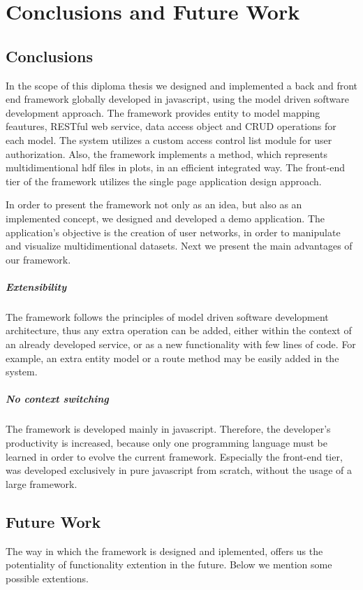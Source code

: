 \chapter{Conclusions and Future Work}

\section{Conclusions}
In the scope of this diploma thesis we designed and implemented a back and front end framework globally developed in javascript, using the model driven software development approach. The framework provides entity to model mapping feautures, RESTful web service, data access object and CRUD operations for each model. The system utilizes a custom access control list module for user authorization. Also, the framework implements a method, which represents multidimentional hdf files in plots, in an efficient integrated way. The front-end tier of the framework utilizes the single page application design approach. \par 
	In order to present the framework not only as an idea, but also as an implemented concept, we designed and developed a demo application. The application's objective is the creation of user networks, in order to manipulate and visualize multidimentional datasets. Next we present the main advantages of our framework.

\paragraph{Extensibility} The framework follows the principles of model driven software development architecture, thus any extra operation can be added, either within the context of an already developed service, or as a new functionality with few lines of code. For example, an extra entity model or a route method may be easily added in the system.
	

\paragraph{No context switching} The framework is developed mainly in javascript. Therefore, the developer's productivity is increased, because only one programming language must be learned in order to evolve the current framework. Especially the front-end tier, was developed exclusively in pure javascript from scratch, without the usage of a large framework.


\section{Future Work}
The way in which the framework is designed and iplemented, offers us the potentiality of functionality extention in the future. Below we mention some possible extentions.

